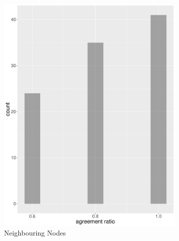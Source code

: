 \begin{figure}
    \centering
    \begin{subfigure}[b]{0.4\textwidth}
        \includegraphics[width=\textwidth]{plots/hist_agreement_nn}
        \caption{Neighbouring Nodes}
        \label{fig:hist_agreement_nn}
    \end{subfigure}
    ~
    \begin{subfigure}[b]{0.4\textwidth}

\end{subfigure}
\end{figure}
